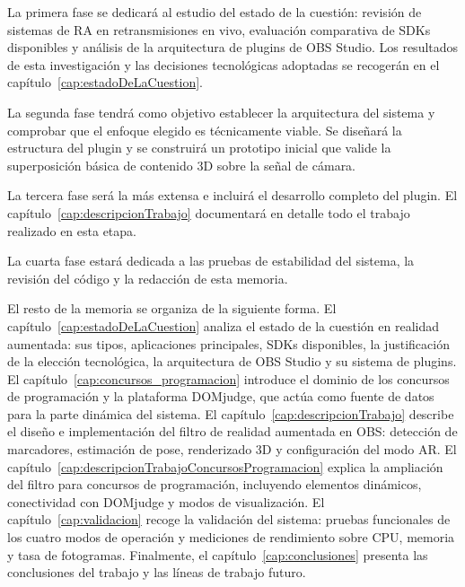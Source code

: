 La primera fase se dedicará al estudio del estado de la cuestión: revisión de sistemas de RA en retransmisiones en vivo, evaluación comparativa de SDKs disponibles y análisis de la arquitectura de plugins de OBS Studio. Los resultados de esta investigación y las decisiones tecnológicas adoptadas se recogerán en el capítulo~\ref{cap:estadoDeLaCuestion}.

La segunda fase tendrá como objetivo establecer la arquitectura del sistema y comprobar que el enfoque elegido es técnicamente viable. Se diseñará la estructura del plugin y se construirá un prototipo inicial que valide la superposición básica de contenido 3D sobre la señal de cámara.

La tercera fase será la más extensa e incluirá el desarrollo completo del plugin. El capítulo~\ref{cap:descripcionTrabajo} documentará en detalle todo el trabajo realizado en esta etapa.

La cuarta fase estará dedicada a las pruebas de estabilidad del sistema, la revisión del código y la redacción de esta memoria.

El resto de la memoria se organiza de la siguiente forma. El capítulo~\ref{cap:estadoDeLaCuestion} analiza el estado de la cuestión en realidad aumentada: sus tipos, aplicaciones principales, SDKs disponibles, la justificación de la elección tecnológica, la arquitectura de OBS Studio y su sistema de plugins. El capítulo~\ref{cap:concursos_programacion} introduce el dominio de los concursos de programación y la plataforma DOMjudge, que actúa como fuente de datos para la parte dinámica del sistema. El capítulo~\ref{cap:descripcionTrabajo} describe el diseño e implementación del filtro de realidad aumentada en OBS: detección de marcadores, estimación de pose, renderizado 3D y configuración del modo AR. El capítulo~\ref{cap:descripcionTrabajoConcursosProgramacion} explica la ampliación del filtro para concursos de programación, incluyendo elementos dinámicos, conectividad con DOMjudge y modos de visualización. El capítulo~\ref{cap:validacion} recoge la validación del sistema: pruebas funcionales de los cuatro modos de operación y mediciones de rendimiento sobre CPU, memoria y tasa de fotogramas. Finalmente, el capítulo~\ref{cap:conclusiones} presenta las conclusiones del trabajo y las líneas de trabajo futuro.



